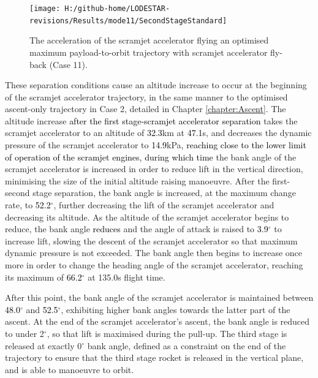   \begin{figure}[!ht] %
  	\centering
  	\texttt{[image: H:/github-home/LODESTAR-revisions/Results/mode11/SecondStageStandard]}
  	\caption{The acceleration of the scramjet accelerator flying an optimised maximum payload-to-orbit trajectory with scramjet accelerator fly-back (Case 11). }
  	\label{fig:SecondStageStandard}
  \end{figure}
  These separation conditions cause an altitude increase to occur at the beginning of the scramjet accelerator trajectory, in the same manner to the optimised ascent-only trajectory in Case 2, detailed in Chapter \ref{chapter:Ascent}.
The altitude increase \textcolor{black}{after the first stage-scramjet accelerator separation} takes the scramjet accelerator to an altitude of \textcolor{black}{32.3}km at \textcolor{black}{47.1}s, and decreases the dynamic pressure of the scramjet accelerator to \textcolor{black}{14.9}kPa, \textcolor{black}{reaching close to the lower limit of operation of the scramjet engines,} \textcolor{black}{during which time} the bank angle of the scramjet accelerator is increased in order to reduce lift in the vertical direction, minimising the size of the initial altitude raising manoeuvre. 
 After the first-second stage separation, the bank angle is increased, at the maximum change rate, to \textcolor{black}{52.2}$^\circ$, further decreasing the lift of the scramjet accelerator and decreasing its altitude. As the altitude of the scramjet accelerator begins to reduce, the bank angle \textcolor{black}{reduces} and the angle of attack is raised to \textcolor{black}{3.9}$^\circ$ to increase lift, slowing the descent of the scramjet accelerator so that maximum dynamic pressure is not exceeded. 
 The bank angle then begins to increase once more in order to change the heading angle of the scramjet accelerator, reaching its maximum of \textcolor{black}{66.2}$^\circ$ at 135.0s flight time. 

After this point, the bank angle of the scramjet accelerator is maintained between \textcolor{black}{48.0}$^\circ$ and \textcolor{black}{52.5}$^\circ$, exhibiting higher bank angles towards the latter part of the ascent. At the end of the scramjet accelerator's ascent, the bank angle is reduced to under 2$^\circ$, so that lift is maximised during the pull-up. The third stage is released at exactly 0$^\circ$ bank angle, defined as a constraint on the end of the trajectory to ensure that the third stage rocket is released in the vertical plane, and is able to manoeuvre to orbit. 


